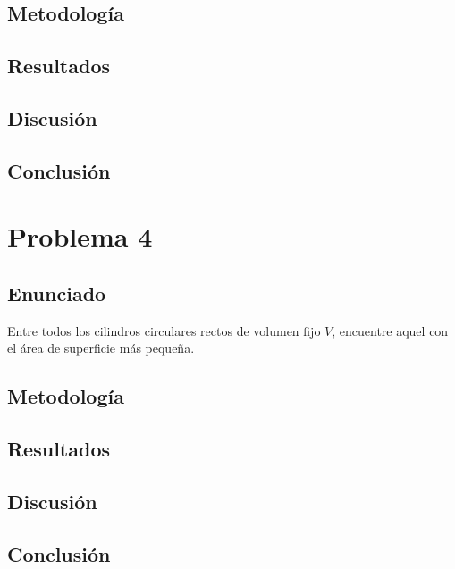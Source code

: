 \documentclass{article}
\begin{document}
\subsection{Metodología}

\subsection{Resultados}
\setcounter{equation}{0}

\subsection{Discusión}

\subsection{Conclusión}

\section{Problema 4}

\subsection{Enunciado}
Entre todos los cilindros circulares rectos de volumen fijo $V$, encuentre aquel con el área de superficie más pequeña.

\subsection{Metodología}

\subsection{Resultados}
\setcounter{equation}{0}

\subsection{Discusión}

\subsection{Conclusión}

\end{document}
